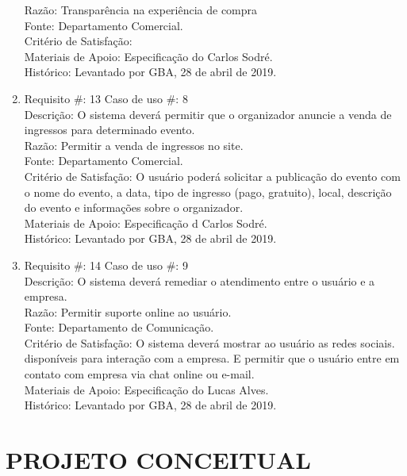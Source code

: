 \documentclass[12pt]{article}
\begin{document}
\begin{enumerate}
                    Razão: Transparência na experiência de compra\\
                    Fonte: Departamento Comercial.\\
                    Critério de Satisfação: \\
                    Materiais de Apoio: Especificação do Carlos Sodré.\\
                    Histórico: Levantado por GBA, 28 de abril de 2019.\\
                \item Requisito \#: 13 Caso de uso \#: 8\\
                    Descrição: O sistema deverá permitir que o organizador anuncie a venda de ingressos para determinado evento. \\
                    Razão: Permitir a venda de ingressos no site. \\
                    Fonte: Departamento Comercial.\\
                    Critério de Satisfação: O usuário poderá solicitar a publicação do evento com o nome do evento, a data, tipo de ingresso (pago, gratuito), local, descrição do evento e informações sobre o organizador.  \\
                    Materiais de Apoio: Especificação d Carlos Sodré.\\
                    Histórico: Levantado por GBA, 28 de abril de 2019.\\
                \item Requisito \#: 14 Caso de uso \#: 9\\
                    Descrição: O sistema deverá remediar o atendimento entre o usuário e a empresa. \\
                    Razão: Permitir suporte online ao usuário. \\
                    Fonte: Departamento de Comunicação.\\
                    Critério de Satisfação: O sistema deverá mostrar ao usuário as redes sociais. disponíveis para interação com a empresa. E permitir que o usuário entre em contato com empresa via chat online ou e-mail.\\
                    Materiais de Apoio: Especificação do Lucas Alves.\\
                    Histórico: Levantado por GBA, 28 de abril de 2019.\\
           \end{enumerate}

    \section{PROJETO CONCEITUAL}
\end{document}
